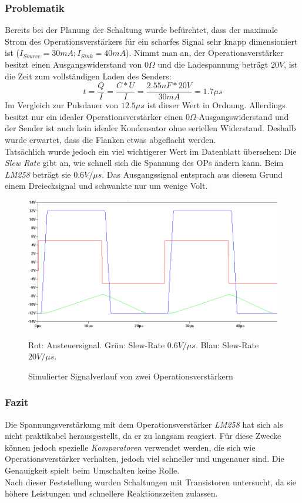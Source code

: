 \subsubsection{Problematik}
Bereits bei der Planung der Schaltung wurde befürchtet, dass der maximale Strom des Operationsverstärkers für ein scharfes Signal sehr knapp dimensioniert ist ($I_{Source}=30mA; I_{Sink}=40mA$). Nimmt man an, der Operationsverstärker besitzt einen Ausgangswiderstand von $0 \Omega$ und die Ladespannung beträgt $20V$, ist die Zeit zum vollständigen Laden des Senders:
\begin{equation}
t=\frac{Q}{I}=\frac{C*U}{I}=\frac{2.55nF*20V}{30mA}=1.7\mu s
\end{equation}
Im Vergleich zur Pulsdauer von $12.5\mu s$ ist dieser Wert in Ordnung. Allerdings besitzt nur ein idealer Operationsverstärker einen $0\Omega$-Ausgangswiderstand und der Sender ist auch kein idealer Kondensator ohne seriellen Widerstand. Deshalb wurde erwartet, dass die Flanken etwas abgeflacht werden.\\
Tatsächlich wurde jedoch ein viel wichtigerer Wert im Datenblatt übersehen: Die \textit{Slew Rate} gibt an, wie schnell sich die Spannung des OPs ändern kann. Beim \textit{LM258} beträgt sie $0.6V/\mu s$. Das Ausgangssignal entsprach aus diesem Grund einem Dreiecksignal und schwankte nur um wenige Volt.
\begin{figure}[H]
\centering
\includegraphics[scale=0.6]{images/signalverlauf_opamps.png}
\caption{Simulierter Signalverlauf von zwei Operationsverstärkern} \label{img:I2}
Rot: Ansteuersignal. Grün: Slew-Rate $0.6V/\mu s$. Blau: Slew-Rate $20V/\mu s$.
\end{figure}

\subsubsection{Fazit}
Die Spannungsverstärkung mit dem Operationsverstärker \textit{LM258} hat sich als nicht praktikabel herausgestellt, da er zu langsam reagiert. Für diese Zwecke können jedoch spezielle \textit{Komparatoren} verwendet werden, die sich wie Operationsverstärker verhalten, jedoch viel schneller und ungenauer sind. Die Genauigkeit spielt beim Umschalten keine Rolle.\\
Nach dieser Feststellung wurden Schaltungen mit Transistoren untersucht, da sie höhere Leistungen und schnellere Reaktionszeiten zulassen.


